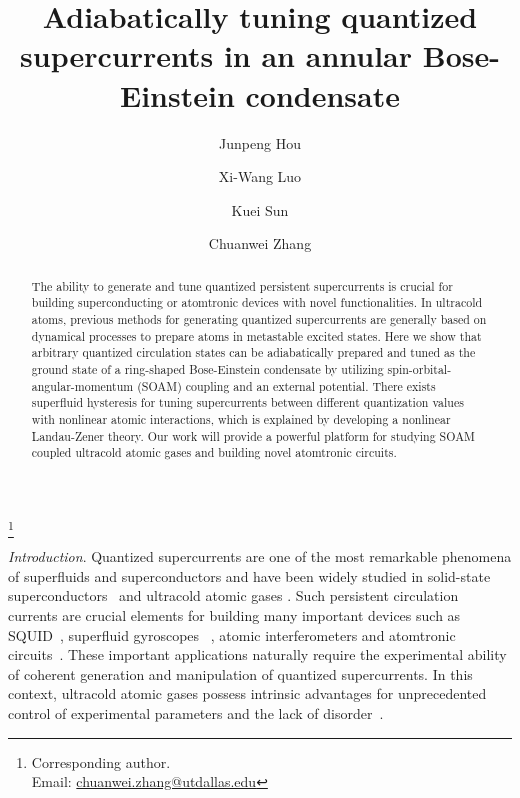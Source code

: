 \documentclass[twocolumn,prl,floatfix,citeautoscript,nofootinbib]{revtex4-1}
\begin{document}
\author{Junpeng Hou}
\author{Xi-Wang Luo}
\author{Kuei Sun}
\author{Chuanwei Zhang}
\thanks{Corresponding author. \\
Email: \href{mailto:chuanwei.zhang@utdallas.edu}{chuanwei.zhang@utdallas.edu}%
}
\title{Adiabatically tuning quantized supercurrents in an annular
Bose-Einstein condensate}

\begin{abstract}
The ability to generate and tune quantized persistent supercurrents is
crucial for building superconducting or atomtronic devices with novel
functionalities. In ultracold atoms, previous methods for generating
quantized supercurrents are generally based on dynamical processes to
prepare atoms in metastable excited states. Here we show that arbitrary
quantized circulation states can be adiabatically prepared and tuned as the
ground state of a ring-shaped Bose-Einstein condensate by utilizing
spin-orbital-angular-momentum (SOAM) coupling and an external
potential. There exists superfluid hysteresis for tuning supercurrents
between different quantization values with nonlinear atomic interactions,
which is explained by developing a nonlinear Landau-Zener theory. Our work
will provide a powerful platform for studying SOAM coupled ultracold atomic
gases and building novel atomtronic circuits.
\end{abstract}

\maketitle

\emph{Introduction}. Quantized supercurrents are one of the most remarkable
phenomena of superfluids and superconductors and have been widely studied in
solid-state superconductors~\cite{Tinkham2004} and ultracold atomic gases
\cite{Ryu2007,Corman2014}. Such persistent circulation currents are crucial
elements for building many important devices such as SQUID~\cite%
{Ryu2013,Sato2013,Clarke2004}, superfluid gyroscopes~\cite%
{Gustavson1997,Packard1992,Schwab1997} , atomic interferometers \cite%
{Kasevich1991,Mathew2015,Marti2015,Hoskinson2006,Simmonds2001} and
atomtronic circuits~\cite{Seaman2007,Pepino2009}. These important
applications naturally require the experimental ability of coherent
generation and manipulation of quantized supercurrents. In this context,
ultracold atomic gases possess intrinsic advantages for unprecedented
control of experimental parameters and the lack of disorder~\cite{Bloch2008}.
\end{document}
